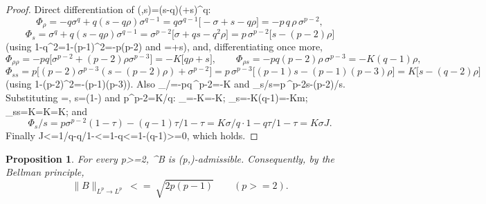 \documentclass[10pt,reqno]{amsart}
\def\({}\def\){}%
\def\frac#1#2{#1/#2}%
\def\ge{>=}\def\le{<=}%
\newtheorem{proposition}[theorem]{Proposition}
\theoremstyle{definition}
\theoremstyle{remark}
\begin{document}
\begin{proof}
Direct differentiation of \(\Phi(\rho,s)=(s-q\rho)(\rho+s)^{q}\): \[\Phi_\rho=-q\sigma^{q}+q(s-q\rho)\sigma^{q-1}=q\sigma^{q-1}\big[-\sigma+s-q\rho\big]
=-p\,q\,\rho\,\sigma^{p-2},\] \[\Phi_s=\sigma^{q}+q(s-q\rho)\sigma^{q-1}=\sigma^{p-2}\big[\sigma+qs-q^2\rho\big]
=p\,\sigma^{p-2}\big[s-(p-2)\rho\big]\] (using \(1-q^2=1-(p-1)^2=-p(p-2)\) and \(\sigma=\rho+s\)), and, differentiating once more, \[\Phi_{\rho\rho}=-pq\big[\sigma^{p-2}+(p-2)\rho\sigma^{p-3}\big]=-K\big[q\rho+s\big],
\qquad \Phi_{\rho s}=-pq(p-2)\rho\,\sigma^{p-3}=-K(q-1)\rho,\] \[\Phi_{ss}=p\big[(p-2)\sigma^{p-3}(s-(p-2)\rho)+\sigma^{p-2}\big]
=p\,\sigma^{p-3}\big[(p-1)s-(p-1)(p-3)\rho\big]=K\big[s-(q-2)\rho\big]\] (using \(1-(p-2)^2=-(p-1)(p-3)\)). Also \(\frac{\Phi_\rho}{\rho}=-pq\,\sigma^{p-2}=-K\sigma\) and \(\frac{\Phi_s}{s}=p\,\sigma^{p-2}\frac{s-(p-2)\rho}{s}\). Substituting \(\rho=\tau\sigma\), \(s=(1-\tau)\sigma\) and \(p\sigma^{p-2}=K\sigma/q\): \(\Phi_{\rho\rho}=-K=-K\sigma[1+m]\); \(\Phi_{\rho s}=-K\sigma(q-1)\tau=-K\sigma m\); \(\Phi_{ss}=K=K\sigma[1-(q-1)\tau]=K\sigma[1-m]\); and \[\frac{\Phi_s}{s}=p\sigma^{p-2}\frac{(1-\tau)-(q-1)\tau}{1-\tau}
=\frac{K\sigma}{q}\cdot\frac{1-q\tau}{1-\tau}=K\sigma J .\] Finally \(J\le1/q\iff\frac{1-q\tau}{1-\tau}\le1-q\tau\le1-\tau\iff(q-1)\tau\ge0\), which holds.
\end{proof}

\begin{proposition}\label{prop:4-4}
For every \(p\ge2\), \(\varphi^{\mathrm B}\) is \(\big(p,\big)\)-admissible. Consequently, by the Bellman principle, \[\|B\|_{L^p\to L^p}\ \le\ \sqrt{2p(p-1)}\qquad(p\ge2). \tag{4.3}\]
\end{proposition}
\end{document}
